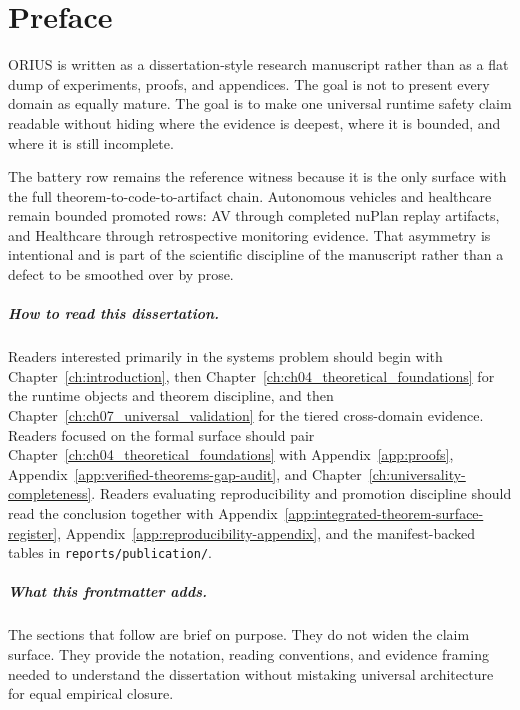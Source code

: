 \chapter*{Preface}

ORIUS is written as a dissertation-style research manuscript rather than as a
flat dump of experiments, proofs, and appendices.  The goal is not to present
every domain as equally mature.  The goal is to make one universal runtime
safety claim readable without hiding where the evidence is deepest, where it is
bounded, and where it is still incomplete.

The battery row remains the reference witness because it is the only surface
with the full theorem-to-code-to-artifact chain.  Autonomous vehicles and
healthcare remain bounded promoted rows: AV through completed nuPlan replay
artifacts, and Healthcare through retrospective monitoring evidence.  That
asymmetry is intentional and is part of the scientific discipline of the
manuscript rather than a defect to be smoothed over by prose.

\paragraph{How to read this dissertation.}
Readers interested primarily in the systems problem should begin with
Chapter~\ref{ch:introduction}, then Chapter~\ref{ch:ch04_theoretical_foundations}
for the runtime objects and theorem discipline, and then
Chapter~\ref{ch:ch07_universal_validation} for the tiered cross-domain
evidence.  Readers focused on the formal surface should pair
Chapter~\ref{ch:ch04_theoretical_foundations} with
Appendix~\ref{app:proofs}, Appendix~\ref{app:verified-theorems-gap-audit}, and
Chapter~\ref{ch:universality-completeness}.  Readers evaluating reproducibility
and promotion discipline should read the conclusion together with
Appendix~\ref{app:integrated-theorem-surface-register},
Appendix~\ref{app:reproducibility-appendix}, and the manifest-backed tables in
\texttt{reports/publication/}.

\paragraph{What this frontmatter adds.}
The sections that follow are brief on purpose.  They do not widen the claim
surface.  They provide the notation, reading conventions, and evidence framing
needed to understand the dissertation without mistaking universal architecture
for equal empirical closure.
